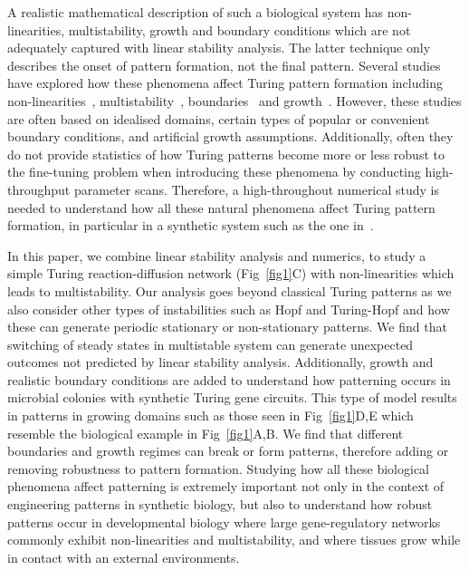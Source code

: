 A realistic mathematical description of such a biological system has non-linearities, multistability, growth and boundary conditions which are not adequately captured with linear stability analysis. The latter technique only describes the onset of pattern formation, not the final pattern.
Several studies have explored how these phenomena affect Turing pattern formation including non-linearities~\parencite{ermentrout1991stripes}, multistability~\parencite{Krause2023}, boundaries~\parencite{Arcuri1986,Maini1993, Maini1997,Krause2020, Krause2021, Woolley2022} and growth~\parencite{gaffney2010, Klika2017, Krause2019}.
However, these studies are often based on idealised domains, certain types of popular or convenient boundary conditions, and artificial growth assumptions.
Additionally, often they do not provide statistics of how Turing patterns become more or less robust to the fine-tuning problem when introducing these phenomena by conducting high-throughput parameter scans.
Therefore, a high-throughout numerical study is needed to understand how all these natural phenomena affect Turing pattern formation, in particular in a synthetic system such as the one in~\cite{Oliver2023}.

In this paper, we combine linear stability analysis and numerics, to study a simple Turing reaction-diffusion network (Fig~\ref{fig1}C) with non-linearities which leads to multistability.
Our analysis goes beyond classical Turing patterns as we also consider other types of instabilities such as Hopf and Turing-Hopf and how these can generate periodic stationary or non-stationary patterns.
We find that switching of steady states in multistable system can generate unexpected outcomes not predicted by linear stability analysis.
Additionally, growth and realistic boundary conditions are added to understand how patterning occurs in microbial colonies with synthetic Turing gene circuits. This type of model results in patterns in growing domains such as those seen in Fig~\ref{fig1}D,E which resemble the biological example in Fig~\ref{fig1}A,B. 
We find that different boundaries and growth regimes can break or form patterns, therefore adding or removing robustness to pattern formation.
Studying how all these biological phenomena affect patterning is extremely important not only in the context of engineering patterns in synthetic biology, but also to understand how robust patterns occur in developmental biology where large gene-regulatory networks commonly exhibit non-linearities and multistability, and where tissues grow while in contact with an external environments.


